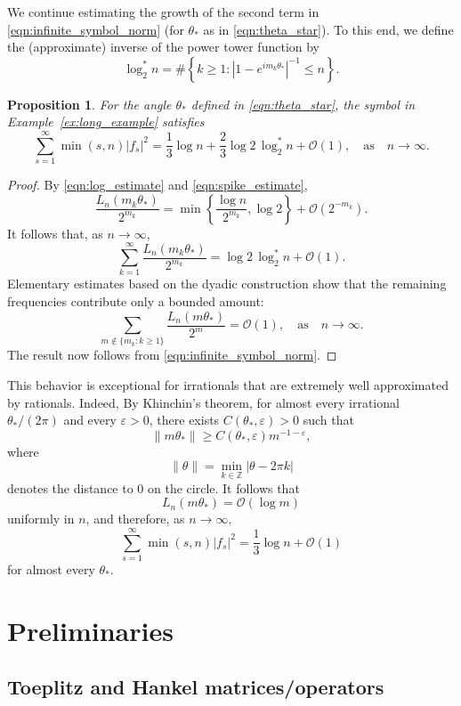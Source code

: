 \documentclass[11pt]{amsart}
\theoremstyle{plain}
\newtheorem{proposition}[theorem]{Proposition}
\theoremstyle{remark}
\numberwithin{equation}{section}
\begin{document}
We continue estimating the growth of the second term in \eqref{eqn:infinite_symbol_norm} (for $\theta_*$ as in \eqref{eqn:theta_star}). To this end, 
we define the (approximate) inverse of the power tower function by
\[
\log_2^* n
=
\#\left\{
k\geq 1:
|1-e^{im_k\theta_*}|^{-1}\leq n
\right\}.
\]
%
%
%
\begin{proposition}
For the angle $\theta_*$ defined in \eqref{eqn:theta_star}, the symbol in
Example~\ref{ex:long_example} satisfies
\[
\sum_{s=1}^{\infty}\min(s,n)|f_s|^2
=
\frac{1}{3}\log n
+
\frac{2}{3}\log 2\,\log_2^* n
+
\mathcal{O}(1),
\quad\text{as}\quad  n\to\infty.
\]
\end{proposition}

\begin{proof}
By \eqref{eqn:log_estimate} and \eqref{eqn:spike_estimate}, 
\[
\frac{L_n(m_k\theta_*)}{2^{m_k}}
=
\min\left\{
\frac{\log n}{2^{m_k}},
\log 2
\right\}
+
\mathcal{O}(2^{-m_k}).
\]
It follows that, as $n\rightarrow\infty$,
\[
\sum_{k=1}^{\infty}
\frac{L_n(m_k\theta_*)}{2^{m_k}}
=
\log 2\,\log_2^* n+\mathcal{O}(1).
\]
Elementary estimates based on the dyadic construction show that the
remaining frequencies contribute only a bounded amount:
\[
\sum_{m\notin\{m_k:k\geq 1\}}
\frac{L_n(m\theta_*)}{2^m}
=
\mathcal{O}(1),\quad\text{as}\quad n\rightarrow\infty.
\]
The result now follows from \eqref{eqn:infinite_symbol_norm}.
\end{proof}

This behavior is exceptional for irrationals that are extremely well approximated by rationals. Indeed,  By Khinchin's theorem, for almost every
irrational $\theta_*/(2\pi)$ and every $\varepsilon>0$, there exists
$C(\theta_*,\varepsilon)>0$ such that
\[
\|m\theta_*\|
\geq
C(\theta_*,\varepsilon)m^{-1-\varepsilon},
\]
where
\[
\|\theta\|
=
\min_{k\in\mathbb{Z}}|\theta-2\pi k|
\]
denotes the distance to $0$ on the circle. It follows that
\[
L_n(m\theta_*)=\mathcal{O}(\log m)
\]
uniformly in $n$, and therefore, as $n\rightarrow\infty,$
\[
\sum_{s=1}^{\infty}\min(s,n)|f_s|^2
=
\frac{1}{3}\log n+\mathcal{O}(1)
\]
for almost every $\theta_*$. 




%
%
%
%
%
%
%



\section{Preliminaries }\label{sec:prel}

\subsection{Toeplitz and Hankel matrices/operators}
\end{document}
